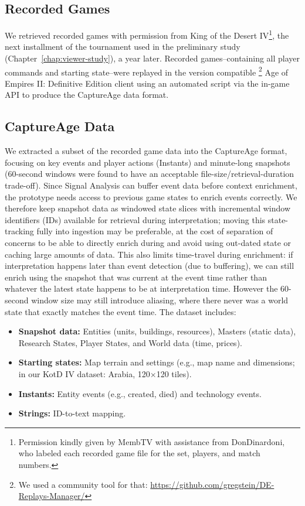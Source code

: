 \subsection{Recorded Games}
We retrieved recorded games with permission from King of the Desert IV\footnote{Permission kindly given by MembTV with assistance from DonDinardoni, who labeled each recorded game file for the set, players, and match numbers.}, the next installment of the tournament used in the preliminary study (Chapter~\ref{chap:viewer-study}), a year later. Recorded games--containing all player commands and starting state--were replayed in the version compatible \footnote{We used a community tool for that: \url{https://github.com/gregstein/DE-Replays-Manager/}} Age of Empires II: Definitive Edition client using an automated script via the in-game API to produce the CaptureAge data format.

\subsection{CaptureAge Data}
We extracted a subset of the recorded game data into the CaptureAge format, focusing on key events and player actions (Instants) and minute-long snapshots (60-second windows were found to have an acceptable file-size/retrieval-duration trade-off). Since Signal Analysis can buffer event data before context enrichment, the prototype needs access to previous game states to enrich events correctly. We therefore keep snapshot data as windowed state slices with incremental window identifiers (IDs) available for retrieval during interpretation; moving this state-tracking fully into ingestion may be preferable, at the cost of separation of concerns to be able to directly enrich during and avoid using out-dated state or caching large amounts of data. This also limits time-travel during enrichment: if interpretation happens later than event detection (due to buffering), we can still enrich using the snapshot that was current at the event time rather than whatever the latest state happens to be at interpretation time. However the 60-second window size may still introduce aliasing, where there never was a world state that exactly matches the event time. The dataset includes:
\begin{itemize}
  \item \textbf{Snapshot data:} Entities (units, buildings, resources), Masters (static data), Research States, Player States, and World data (time, prices).
  \item \textbf{Starting states:} Map terrain and settings (e.g., map name and dimensions; in our KotD IV dataset: Arabia, 120$\times$120 tiles).
  \item \textbf{Instants:} Entity events (e.g., created, died) and technology events.
  \item \textbf{Strings:} ID-to-text mapping.
\end{itemize}

